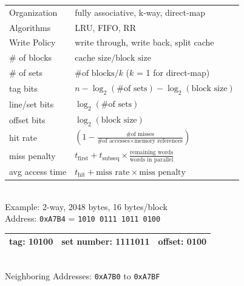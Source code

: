 \documentclass[10pt]{article}
\newcommand{\code}[1]{\texttt{#1}}
\begin{document}
\begin{multicols*}{2}
    \begin{tcolorbox}[title=Cache Organization and Performance]
        \begin{tabular}{ll}
            Organization    & fully associative, k-way, direct-map                                                                  \\
            Algorithms      & LRU, FIFO, RR                                                                                         \\
            Write Policy    & write through, write back, split cache                                                                \\
            \# of blocks    & $\text{cache size} / \text{block size}$                                                               \\
            \# of sets      & $\text{\# of blocks}/ k$ ($k$ = 1 for direct-map)                                                     \\
            tag bits        & $n - \log_2(\text{\# of sets}) - \log_2(\text{block size})$                                           \\
            line/set bits   & $\log_2(\text{\# of sets})$                                                                           \\
            offset bits     & $\log_2(\text{block size})$                                                                           \\
            hit rate        & $(1 - \frac{\text{\# of misses}}{\text{\# of accesses} \times \text{memory references}})$             \\
            miss penalty    & $t_{\text{first}} + t_{\text{subseq}} \times \frac{\text{remaining words}}{\text{words in parallel}}$ \\
            avg access time & $ t_{\text{hit}} + \text{miss rate} \times \text{miss penalty}$                                       \\
            \hline
        \end{tabular} \\
        Example: 2-way, 2048 bytes, 16 bytes/block \\
        Address: \code{0xA7B4} = \code{1010 0111 1011 0100} \\
        \begin{tabular}{|c|c|c|}
            \hline
            tag: 10100 & set number: 1111011 & offset: 0100 \\
            \hline
        \end{tabular} \\
        Neighboring Addresses: \code{0xA7B0} to \code{0xA7BF}
    \end{tcolorbox}


\end{multicols*}
\end{document}
